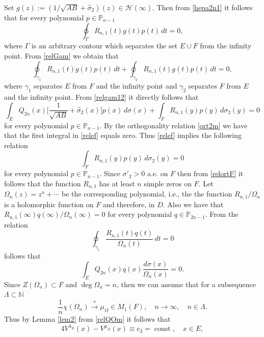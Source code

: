 \documentclass[11pt, a4paper, twoside]{article}
\let\myh\widehat
\def\NN{\mathbb N}
\def\PP{\mathbb P}
\def\HH{\mathscr H}
\def\mdeg{\operatorname{deg}}
\def\const{\operatorname{const}}
\theoremstyle{plain}
\theoremstyle{definition}
\begin{document}
Set $g(z):=(1/\sqrt{AB}+\myh{\sigma}_2)(z)\in\HH(\infty)$. Then from \eqref{hepa2n1} it follows that for every polynomial $p\in\PP_{n-1}$
\begin{equation}
\oint_\Gamma R_{n,1}(t)g(t)p(t)\,dt=0, 
\label{relGam}
\end{equation}
where $\Gamma$ is an arbitrary contour which separates the set $E\cup F$ from the infinity point. From \eqref{relGam} we obtain that
\begin{equation}
\oint_{\gamma_1}R_{n,1}(t)g(t)p(t)\,dt+
\oint_{\gamma_2}R_{n,1}(t)g(t)p(t)\,dt=0,
\label{relgam12}
\end{equation}
where $\gamma_1$ separates $E$ from $F$ and the infinity point and $\gamma_2$ separates $F$ from $E$ and the infinity point. From \eqref{relgam12} it directly follows that
\begin{equation}
\int_E Q_{2n}(x)\biggl[\frac1{\sqrt{AB}}+\myh{\sigma}_2(x)\biggr]p(x)\,d\sigma(x)+
\int_F R_{n,1}(y)p(y)\,d\sigma_2(y)=0
\label{relef}
\end{equation}
for every polynomial $p\in\PP_{n-1}$. By the orthogonality relation \eqref{ort2m} we have that the first integral in \eqref{relef} equals zero. Thus \eqref{relef} implies the following relation
\begin{equation}
\int_F R_{n,1}(y)p(y)\,d\sigma_2(y)=0
\label{relortF}
\end{equation}
for every polynomial $p\in\PP_{n-1}$. Since $\sigma'_2>0$ a.e. on $F$ then from \eqref{relortF} it follows that the function $R_{n,1}$ has at least $n$  simple zeros  on $F$. Let $\Omega_n(z)=z^n+\dotsb$  be the corresponding polynomial, i.e., the  the function $R_{n,1}/\Omega_n$ is a holomorphic function on $F$ and therefore, in $D$. Also we have that $R_{n,1}(\infty)q(\infty)/\Omega_n(\infty)=0$ for every polynomial $q\in\PP_{2n-1}$.  From the relation
\begin{equation}
\oint_{\gamma_1}\frac{R_{n,1}(t)q(t)}{\Omega_n(t)}\,dt=0
\label{relROm}
\end{equation}
follows that 
\begin{equation}
\int_E Q_{2n}(x)q(x)\frac{d\sigma(x)}{\Omega_n(x)}=0.
\label{relQOm}
\end{equation}
Since $Z(\Omega_n)\subset F$ and  $\mdeg{\Omega_n}=n$, then we can assume that for a subsequence $\Lambda\subset\NN$
$$
\frac1n\chi(\Omega_n) \overset{*}\longrightarrow {\mu_\Omega}\in M_1(F),
\quad n\to\infty, \quad n\in\Lambda.
$$
Thus by Lemma \ref{lem2} from \eqref{relQOm} it follows that
\begin{equation}
4V^{\lambda_E}(x)-V^{\mu_\Omega}(x)\equiv c_3=\const, 
\quad x\in E,
\label{equQOm}
\end{equation}
\end{document}

